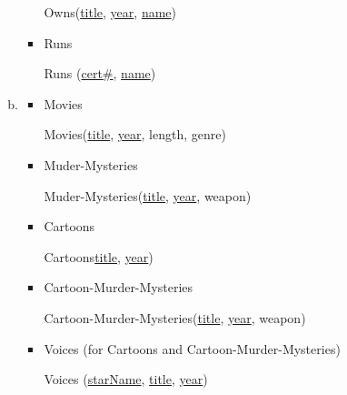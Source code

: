 \documentclass[12pt]{article}
\begin{document}
\begin{enumerate}[1.]
\begin{enumerate}[a)]
\begin{itemize}
            \bigskip

            \quad Owns(\underline{title}, \underline{year}, \underline{name})

            \bigskip

            \item Runs

            \bigskip

            \quad Runs (\underline{cert\#}, \underline{name})

            \bigskip
        \end{itemize}

        \item

        \begin{itemize}
            \item Movies

            \bigskip

            \quad Movies(\underline{title}, \underline{year}, length, genre)

            \bigskip

            \item Muder-Mysteries

            \bigskip

            \quad Muder-Mysteries(\underline{title}, \underline{year}, weapon)

            \bigskip

            \item Cartoons

            \bigskip

            \quad Cartoons\underline{title}, \underline{year})

            \bigskip

            \item Cartoon-Murder-Mysteries

            \bigskip

            \quad Cartoon-Murder-Mysteries(\underline{title}, \underline{year}, weapon)

            \bigskip

            \item Voices (for Cartoons and Cartoon-Murder-Mysteries)

            \bigskip

            \quad Voices (\underline{starName}, \underline{title}, \underline{year})

            \bigskip
        \end{itemize}


\end{enumerate}
\end{enumerate}
\end{document}
